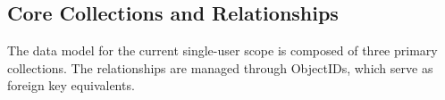 \subsection{Core Collections and Relationships}
The data model for the current single-user scope is composed of three primary collections. The relationships are managed through ObjectIDs, which serve as foreign key equivalents.





